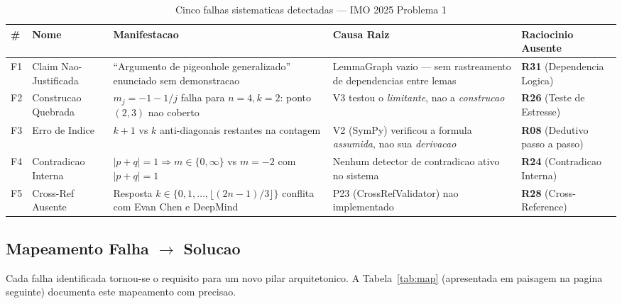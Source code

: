 \documentclass[5p]{elsarticle}
\begin{document}
\begin{table}[H]
  \centering
  \caption{Cinco falhas sistematicas detectadas — IMO 2025 Problema 1}
  \label{tab:f5}
  \small
  \begin{tabular}{p{0.6cm}p{2.2cm}p{4cm}p{3cm}p{3.5cm}}
    \toprule
    \textbf{\#} & \textbf{Nome} & \textbf{Manifestacao} & \textbf{Causa Raiz} & \textbf{Raciocinio Ausente} \\
    \midrule
    F1 & Claim Nao-Justificada & ``Argumento de pigeonhole generalizado'' enunciado sem demonstracao & LemmaGraph vazio --- sem rastreamento de dependencias entre lemas & \textbf{R31} (Dependencia Logica) \\
    \rowcolor{yellowbg}
    F2 & Construcao Quebrada & $m_j=-1-1/j$ falha para $n=4,k=2$: ponto $(2,3)$ nao coberto & V3 testou o \textit{limitante}, nao a \textit{construcao} & \textbf{R26} (Teste de Estresse) \\
    F3 & Erro de Indice & $k+1$ vs $k$ anti-diagonais restantes na contagem & V2 (SymPy) verificou a formula \textit{assumida}, nao sua \textit{derivacao} & \textbf{R08} (Dedutivo passo a passo) \\
    \rowcolor{yellowbg}
    F4 & Contradicao Interna & $|p+q|=1\Rightarrow m\in\{0,\infty\}$ vs $m=-2$ com $|p+q|=1$ & Nenhum detector de contradicao ativo no sistema & \textbf{R24} (Contradicao Interna) \\
    F5 & Cross-Ref Ausente & Resposta $k\in\{0,1,\dots,\lfloor(2n-1)/3\rfloor\}$ conflita com Evan Chen e DeepMind & P23 (CrossRefValidator) nao implementado & \textbf{R28} (Cross-Reference) \\
    \bottomrule
  \end{tabular}
\end{table}

\subsection{Mapeamento Falha $\to$ Solucao}

Cada falha identificada tornou-se o requisito para um novo pilar arquitetonico.
A Tabela~\ref{tab:map} (apresentada em paisagem na pagina seguinte) documenta
este mapeamento com precisao.
\end{document}
